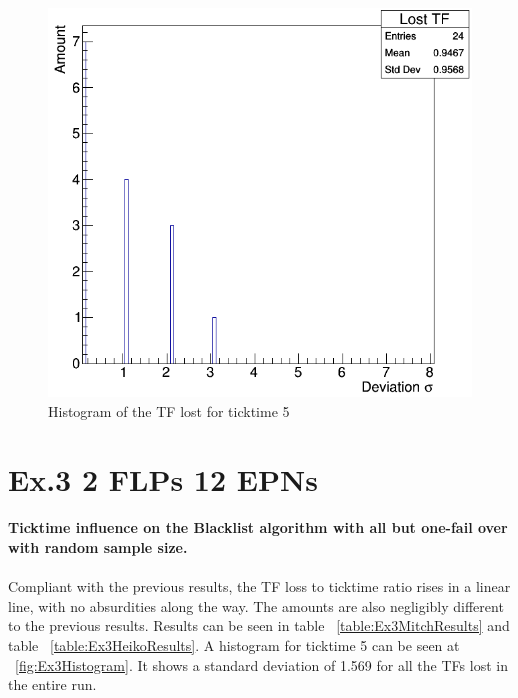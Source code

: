 \newpage

\begin{figure}[h!]
	\centering
	\includegraphics[scale=0.5]{./graphics/ex2_histogram.png}
	\caption{Histogram of the TF lost for ticktime 5}
	\label{Ex2Histogram}
\end{figure}

\newpage

\section{Ex.3 2 FLPs 12 EPNs}
\textbf{Ticktime influence on the Blacklist algorithm with all but one-fail over with random sample size.}
\\~\\
Compliant with the previous results, the TF loss to ticktime ratio rises in a linear line, with no absurdities along the way. The amounts are also negligibly different to the previous results. Results can be seen in table ~\ref{table:Ex3MitchResults} and table ~\ref{table:Ex3HeikoResults}. A histogram for ticktime 5 can be seen at ~\ref{fig:Ex3Histogram}. It shows a standard deviation of 1.569 for all the TFs lost in the entire run. 

